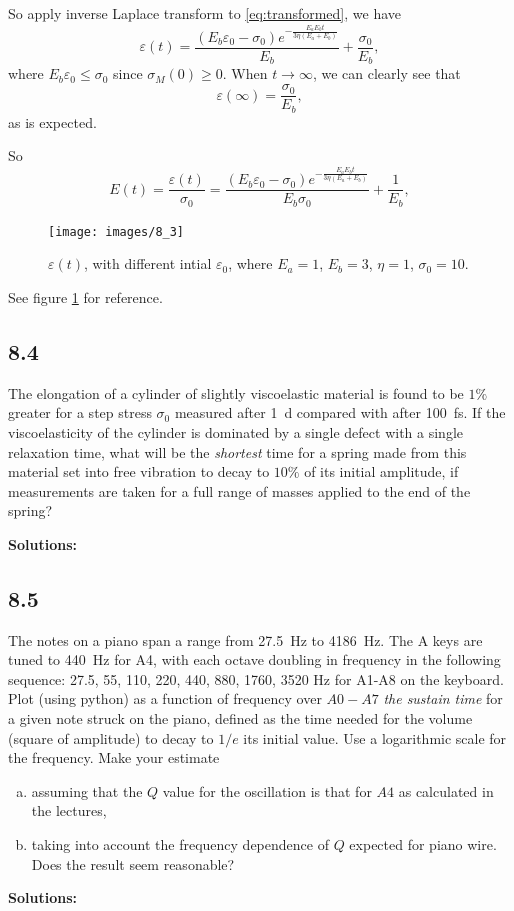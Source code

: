 \documentclass[12pt]{article}
\begin{document}
So apply inverse Laplace transform to \eqref{eq:transformed}, we have
\begin{equation}
  \varepsilon(t) = \frac{(E_b \varepsilon_0-\sigma_0) e^{-\frac{E_a E_b t}{3 \eta (E_a + E_b)}}}{E_b}+\frac{\sigma_0}{E_b},
\end{equation}
where $E_b \varepsilon_0 \leq \sigma_0$ since $\sigma_M(0) \geq 0$.
When $t \rightarrow \infty$, we can clearly see that
\begin{equation}
  \varepsilon(\infty) = \frac{\sigma_0}{E_b},
\end{equation}
as is expected.

So
\begin{equation}
  E(t) = \frac{ \varepsilon(t) }{ \sigma_0 } = \frac{(E_b \varepsilon_0-\sigma_0) e^{-\frac{E_a E_b t}{3 \eta (E_a + E_b)}}}{E_b \sigma_0}+\frac{1}{E_b},
\end{equation}
\begin{figure}[h]
  \centering
  \texttt{[image: images/8\_3]}
  \caption{$\varepsilon(t)$, with different intial $\varepsilon_0$, where $E_a = 1$, $E_b = 3$, $\eta = 1$, $\sigma_0 = 10$.}
  \label{fig:question_8_3}
\end{figure}

See figure \ref{fig:question_8_3} for reference.

\subsection{8.4}
The elongation of a cylinder of slightly viscoelastic material is found to be
$1\%$ greater for a step stress $\sigma_0$ measured after \SI{1}{\day} compared with after \SI{100}{\femto\second}.
If the viscoelasticity of the cylinder is dominated by a single defect
with a single relaxation time, what will be the \emph{shortest} time for a spring made from this
material set into free vibration to decay to $10\%$ of its initial amplitude,
if measurements are taken for a full range of masses applied to the end of the spring?

\textbf{Solutions:}

\subsection{8.5}
The notes on a piano span a range from \SI{27.5}{\hertz} to \SI{4186}{\hertz}.
The A keys are tuned to \SI{440}{\hertz} for A4, with each octave doubling in frequency
in the following sequence: 27.5, 55, 110, 220, 440, 880, 1760, 3520 Hz for A1-A8 on
the keyboard.  Plot (using python) as a function of frequency over $A0-A7$ \emph{the sustain time}
for a given note struck on the piano, defined as the time needed for the volume (square of amplitude)
to decay to $1/e$ its initial value.  Use a logarithmic scale for the frequency. Make your estimate
\begin{enumerate}[a)]
  \item assuming that the $Q$ value for the oscillation is that for $A4$ as calculated in the lectures,
  \item taking into account the frequency dependence of $Q$ expected for piano wire. Does the result seem reasonable?
\end{enumerate}

\textbf{Solutions:}

% 
% 

\end{document}
